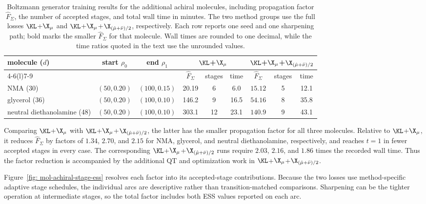 \documentclass{article}
\begin{document}
\begin{table}[htb]
\centering
\small
\setlength{\tabcolsep}{3.5pt}
\begin{tabular}{lcccccccc}
\toprule
\multirow{2}{*}{molecule (\(d\))} &
\multirow{2}{*}{start \(\rho_0\)} &
\multirow{2}{*}{end \(\rho_1\)} &
\multicolumn{3}{c}{$\KL$+$\X_\mu$} &
\multicolumn{3}{c}{$\KL$+$\X_\mu$+$\X_{(\hat\mu+\bar\nu)/2}$} \\
\cmidrule(lr){4-6}\cmidrule(l){7-9}
& & & \(\hat F_\Sigma\) & stages & time
  & \(\hat F_\Sigma\) & stages & time \\
\midrule
NMA (30) & \((50,0.20)\) & \((100,0.15)\)
& 20.19 & 6 & 6.0 & \(\mathbf{15.12}\) & 5 & 12.1 \\
\addlinespace
glycerol (36) & \((50,0.20)\) & \((100,0.10)\)
& 146.2 & 9 & 16.5 & \(\mathbf{54.16}\) & 8 & 35.8 \\
\addlinespace
neutral diethanolamine (48) & \((50,0.20)\) & \((100,0.10)\)
& 303.1 & 12 & 23.1 & \(\mathbf{140.9}\) & 9 & 43.1 \\
\bottomrule
\end{tabular}
\caption{Boltzmann generator training results for the additional achiral molecules, including propagation factor \(\hat F_\Sigma\), the number of accepted stages, and total wall time in minutes. The two method groups use the full losses $\KL$+$\X_\mu$ and $\KL$+$\X_\mu$+$\X_{(\hat\mu+\bar\nu)/2}$, respectively. Each row reports one seed and one sharpening path; bold marks the smaller \(\hat F_\Sigma\) for that molecule. Wall times are rounded to one decimal, while the time ratios quoted in the text use the unrounded values.}
\label{tab: mol-achiral-summary}
\end{table}


Comparing $\KL$+$\X_\mu$ with $\KL$+$\X_\mu$+$\X_{(\hat\mu+\bar\nu)/2}$, the latter has the smaller propagation factor for all three molecules. Relative to $\KL$+$\X_\mu$, it reduces \(\hat F_\Sigma\) by factors of \(1.34\), \(2.70\), and \(2.15\) for NMA, glycerol, and neutral diethanolamine, respectively, and reaches \(t=1\) in fewer accepted stages in every case. The corresponding $\KL$+$\X_\mu$+$\X_{(\hat\mu+\bar\nu)/2}$ runs require \(2.03\), \(2.16\), and \(1.86\) times the recorded wall time. Thus the factor reduction is accompanied by the additional QT and optimization work in $\KL$+$\X_\mu$+$\X_{(\hat\mu+\bar\nu)/2}$.

Figure~\ref{fig: mol-achiral-stage-ess} resolves each factor into its accepted-stage contributions. Because the two losses use method-specific adaptive stage schedules, the individual arcs are descriptive rather than transition-matched comparisons. Sharpening can be the tighter operation at intermediate stages, so the total factor includes both ESS values reported on each arc.
\end{document}
